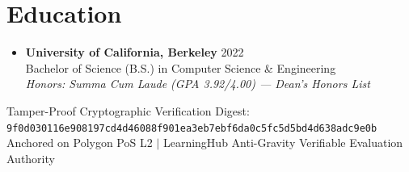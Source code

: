 \documentclass[letterpaper,10pt]{article}
\begin{document}
\section{Education}
\begin{itemize}[leftmargin=0.15in, label={}]
  \item
    \textbf{University of California, Berkeley} \hfill \small{2022} \\
    \small{Bachelor of Science (B.S.) in Computer Science \& Engineering}
    \\ \small{\textit{Honors: Summa Cum Laude (GPA 3.92/4.00) — Dean’s Honors List}}
\end{itemize}

\vfill
\begin{center}
  \footnotesize{\color{gray} Tamper-Proof Cryptographic Verification Digest: \texttt{9f0d030116e908197cd4d46088f901ea3eb7ebf6da0c5fc5d5bd4d638adc9e0b}} \\
  \footnotesize{\color{gray} Anchored on Polygon PoS L2 $|$ LearningHub Anti-Gravity Verifiable Evaluation Authority}
\end{center}
\end{document}
